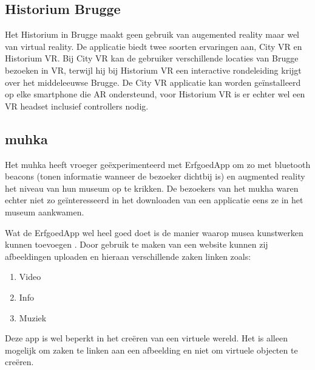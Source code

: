 \subsection{Historium Brugge}
Het Historium in Brugge maakt geen gebruik van augemented reality maar wel van virtual reality. De applicatie biedt twee soorten ervaringen aan, City VR en Historium VR. Bij City VR kan de gebruiker verschillende locaties van Brugge bezoeken in VR, terwijl hij bij Historium VR een interactive rondeleiding krijgt over het middeleeuwse Brugge. De City VR applicatie kan worden geïnstalleerd op elke smartphone die AR ondersteund, voor Historium VR is er echter wel een VR headset inclusief controllers nodig. 

\subsection{\acrlong{muhka}}
Het \acrshort{muhka} heeft vroeger geëxperimenteerd met ErfgoedApp om zo met bluetooth beacons (tonen informatie wanneer de bezoeker dichtbij is) en augmented reality het niveau van hun museum op te krikken. De bezoekers van het \acrshort{mukha} waren echter niet zo geïnteresseerd in het downloaden van een applicatie eens ze in het museum aankwamen. 

Wat de ErfgoedApp wel heel goed doet is de manier waarop musea kunstwerken kunnen toevoegen \autocite{ErfgoedApp}. Door gebruik te maken van een website kunnen zij afbeeldingen uploaden en hieraan verschillende zaken linken zoals:

\begin{enumerate}
    \item Video
    \item Info
    \item Muziek
\end{enumerate}  

Deze app is wel beperkt in het creëren van een virtuele wereld. Het is alleen mogelijk om zaken te linken aan een afbeelding en niet om virtuele objecten te creëren.